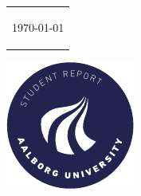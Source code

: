 \begin{titlepage}
{{\begin{tabular}{@{}p{\textwidth}@{}}
   \begin{center}
    {\Large%
      \today
    }
   \end{center}
  \end{tabular}}}
  \vfill
  \begin{center}
    \includegraphics[width=0.2\paperwidth]{titlepage/aau_logo_circle_en}
  \end{center}
\end{titlepage}
\clearpage
